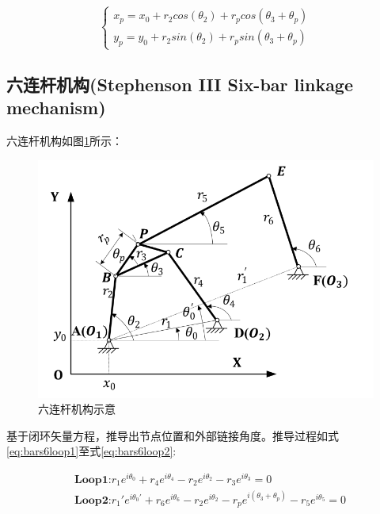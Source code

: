 \documentclass[]{ctexbook}
\theoremstyle{definition}
\theoremstyle{definition}
\theoremstyle{definition}
\theoremstyle{remark}
\begin{document}
\begin{equation}
\begin{cases} 
x_p=x_0+r_2cos(\theta_2)+r_pcos(\theta_3+\theta_p) \\ 
y_p=y_0+r_2sin(\theta_2)+r_psin(\theta_3+\theta_p)
\end{cases}
\label{eq:bars4loop4}
\end{equation}

\subsection{六连杆机构(Stephenson III Six-bar linkage
mechanism)}\label{bars6}

六连杆机构如图\ref{fig:sixbars}所示：

\begin{figure}

{\centering \includegraphics[width=0.7\linewidth]{img/bars6} 

}

\caption{六连杆机构示意}\label{fig:sixbars}
\end{figure}

基于闭环矢量方程，推导出节点位置和外部链接角度。推导过程如式\eqref{eq:bars6loop1}至式\eqref{eq:bars6loop2}:

\begin{equation}
\begin{split}
&\mathbf{\text{Loop1:}}   r_1e^{i\theta_0} + r_4e^{i\theta_4} - r_2e^{i\theta_2} -r_3e^{i\theta_3} = 0\\
&\mathbf{\text{Loop2:}}   r_1'e^{i\theta_0'} + r_6e^{i\theta_6} - r_2e^{i\theta_2} -r_pe^{i(\theta_3+\theta_p)}-r_5e^{i\theta_5} = 0\\
\end{split}
\label{eq:bars6loop1}
\end{equation}
\end{document}
